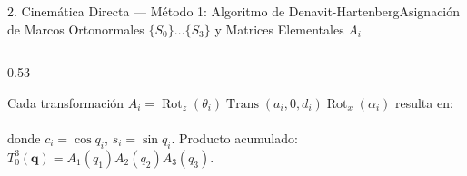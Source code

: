 \documentclass[aspectratio=169,10pt,xcolor=table]{beamer}
\begin{document}
\begin{frame}{2. Cinemática Directa --- Método 1: Algoritmo de Denavit-Hartenberg}{Asignación de Marcos Ortonormales $\{S_0\}\dots\{S_3\}$ y Matrices Elementales $A_i$}
\begin{columns}[T,totalwidth=\textwidth]
\begin{column}{0.53\textwidth}
    \vspace{0.8mm}
    \begin{cajaidea}
      \fontsize{6.6}{8.0}\selectfont
      Cada transformación $A_i = \operatorname{Rot}_z(\theta_i)\operatorname{Trans}(a_i,0,d_i)\operatorname{Rot}_x(\alpha_i)$ resulta en:\\[1.2mm]
      \\[1.2mm]
      donde $c_i=\cos q_i$, $s_i=\sin q_i$. Producto acumulado: $T_0^3(\bm{q}) = A_1(q_1)A_2(q_2)A_3(q_3)$.
    \end{cajaidea}
  \end{column}
\end{columns}
\end{frame}
\end{document}
